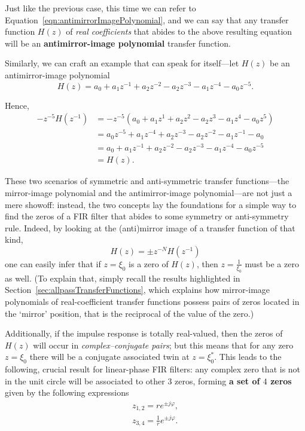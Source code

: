 \documentclass[\documentfontsize, twocolumn]{\classname}
\begin{document}
Just like the previous case, this time we can refer to Equation~\ref{eqn:antimirrorImagePolynomial}, and we can say that any transfer function $H(z)$ of \emph{real coefficients} that abides to the above resulting equation will be an \textbf{antimirror-image polynomial} transfer function. 

Similarly, we can craft an example that can speak for itself---let $H(z)$ be an antimirror-image polynomial
\[
    H(z) = a_0 + a_1z^{-1} + a_2z^{-2} - a_2z^{-3} - a_1z^{-4} - a_0z^{-5}.
\]

Hence,
\begin{align*}
    -z^{-5}H(z^{-1}) &= -z^{-5}(a_0 + a_1z^{1} + a_2z^{2} - a_2z^{3} - a_1z^{4} - a_0z^{5})\\
                     &= a_0z^{-5} + a_1z^{-4} + a_2z^{-3} - a_2z^{-2} - a_1z^{-1} - a_0\\
                     &= a_0 + a_1z^{-1} + a_2z^{-2} - a_2z^{-3} - a_1z^{-4} - a_0z^{-5}\\
                     &= H(z).
\end{align*}

These two scenarios of symmetric and anti-symmetric transfer functions---the mirror-image polynomial and the antimirror-image polynomial---are not just a mere showoff: instead, the two concepts lay the foundations for a simple way to find the zeros of a FIR filter that abides to some symmetry or anti-symmetry rule. Indeed, by looking at the (anti)mirror image of a transfer function of that kind,
\[
    H(z) = \pm z^{-N}H(z^{-1})
\]
one can easily infer that if $z=\xi_0$ is a zero of $H(z)$, then $z=\frac 1 {\xi_0}$ must be a zero as well. (To explain that, simply recall the results highlighted in Section~\ref{sec:allpassTransferFunctions}, which explains how mirror-image polynomials of real-coefficient transfer functions possess pairs of zeros located in the `mirror' position, that is the reciprocal of the value of the zero.)

Additionally, if the impulse response is totally real-valued, then the zeros of $H(z)$ will occur in \emph{complex--conjugate pairs}; but this means that for any zero $z=\xi_0$ there will be a conjugate associated twin at $z=\xi^*_0$. This leads to the following, crucial result for linear-phase FIR filters: any complex zero that is not in the unit circle will be associated to other $3$ zeros, forming \textbf{a set of $4$ zeros} given by the following expressions
\begin{eqnarray}\label{eqn:linearPhaseGeneralZeroLocationsSet}
    z_{1,2} = r e^{\pm j\varphi}, \\
    z_{3,4} = \frac 1 r e^{\pm j\varphi}.
\end{eqnarray}
\end{document}
